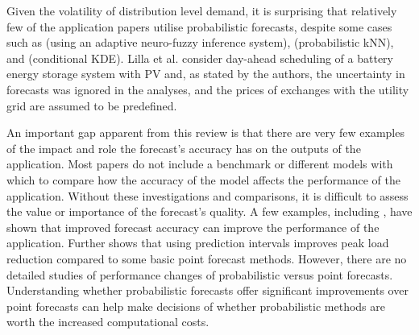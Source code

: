 Given the volatility of distribution level demand, it is surprising that relatively few of the application papers utilise probabilistic forecasts, despite some cases such as \cite{nikolovski2018abp} (using an adaptive neuro-fuzzy inference system), \cite{zufferey2020psf} (probabilistic kNN), and \cite{pinto2017mpf} (conditional KDE). Lilla et al. \cite{Lilla2020dsl} consider day-ahead scheduling of a battery energy storage system with PV and, as stated by the authors, the uncertainty in forecasts was ignored in the analyses, and the prices of exchanges with the utility grid are assumed to be predefined.

An important gap apparent from this review is that there are very few examples of the impact and role the forecast's accuracy has on the outputs of the application. Most papers do not include a benchmark or different models with which to compare how the accuracy of the model affects the performance of the application. Without these investigations and comparisons, it is difficult to assess the value or importance of the forecast's quality. A few examples, including \cite{stephen2020ngr}, \cite{alasali2020acs} have shown that improved forecast accuracy can improve the performance of the application. Further \cite{kodaira2020oes} shows that using prediction intervals improves peak load reduction compared to some basic point forecast methods. However, there are no detailed studies of performance changes of probabilistic versus point forecasts. Understanding whether probabilistic forecasts offer significant improvements over point forecasts can help make decisions of whether probabilistic methods are worth the increased computational costs.
